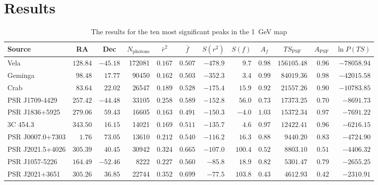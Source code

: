 \documentclass[useAMS,usenatbib]{mn2e}
\begin{document}
\section{Results}

\begin{table}
  \caption{The results for the ten most significant peaks in the 1~GeV map}
\label{tab:topten}
  \begin{tabular}{l|rrrrrrrrrrr}
    \hline
    Source & \multicolumn{1}{c}{RA} & \multicolumn{1}{c}{Dec}  & \multicolumn{1}{c}{$N_\mathrm{photons}$}  & \multicolumn{1}{c}{$\bar r^2$} & \multicolumn{1}{c}{$\bar f$} & \multicolumn{1}{c}{$S(r^2)$} & \multicolumn{1}{c}{$S(f)$} & \multicolumn{1}{c}{$A_f$} & \multicolumn{1}{c}{$TS_\mathrm{PSF}$} & \multicolumn{1}{c}{$A_\mathrm{PSF}$} &
    \multicolumn{1}{c}{$\ln P(TS)$} \\
    \hline

Vela             & $128.84$ & $-45.18$ & 172081 & $0.167$ & $0.507$ & $-478.9$ & $   9.7$ & $0.98$ & $156105.48$ & $0.96$ & $-78058.94$ \\ 
Geminga          & $ 98.48$ & $ 17.77$ &  90450 & $0.162$ & $0.503$ & $-352.3$ & $   3.4$ & $0.99$ & $ 84019.36$ & $0.98$ & $-42015.58$ \\ 
Crab             & $ 83.64$ & $ 22.02$ &  26547 & $0.189$ & $0.528$ & $-175.4$ & $  15.9$ & $0.92$ & $ 21557.26$ & $0.90$ & $-10783.85$ \\ 
PSR J1709-4429   & $257.42$ & $-44.48$ &  33105 & $0.258$ & $0.589$ & $-152.8$ & $  56.0$ & $0.73$ & $ 17373.25$ & $0.70$ & $ -8691.73$ \\ 
PSR J1836+5925   & $279.06$ & $ 59.43$ &  16605 & $0.163$ & $0.491$ & $-150.3$ & $  -4.0$ & $1.03$ & $ 15372.34$ & $0.97$ & $ -7691.22$ \\ 
3C 454.3	 & $343.50$ & $ 16.15$ &  14021 & $0.169$ & $0.511$ & $-135.7$ & $   4.6$ & $0.97$ & $ 12422.41$ & $0.96$ & $ -6216.15$ \\ 
PSR J0007.0+7303 & $  1.76$ & $ 73.05$ &  13610 & $0.212$ & $0.540$ & $-116.2$ & $  16.3$ & $0.88$ & $  9440.20$ & $0.83$ & $ -4724.90$ \\ 
PSR J2021.5+4026 & $305.39$ & $ 40.45$ &  30942 & $0.324$ & $0.665$ & $-107.0$ & $ 100.4$ & $0.52$ & $  8803.10$ & $0.51$ & $ -4406.32$ \\ 
PSR J1057-5226   & $164.49$ & $-52.46$ &   8222 & $0.227$ & $0.560$ & $ -85.8$ & $  18.9$ & $0.82$ & $  5301.47$ & $0.79$ & $ -2655.25$ \\ 
PSR J2021+3651	 & $305.26$ & $ 36.85$ &  22744 & $0.352$ & $0.699$ & $ -77.5$ & $ 103.8$ & $0.43$ & $  4612.93$ & $0.42$ & $ -2310.91$ \\ 
\end{tabular}
\end{table}
\end{document}
